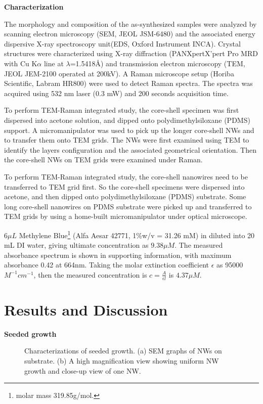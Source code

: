 \documentclass[11pt]{article} %
\begin{document}
\textbf{Characterization}

The morphology and composition of the as-synthesized samples were analyzed by scanning electron microscopy (SEM, JEOL JSM-6480) and the associated energy dispersive X-ray spectroscopy unit(EDS, Oxford Instrument INCA). Crystal structures were characterized using X-ray diffraction (PANXpertX’pert Pro MRD with Cu K$\alpha$ line at $\lambda$=1.5418\AA) and transmission electron microscopy (TEM, JEOL JEM-2100  operated at 200kV). A Raman microscope setup (Horiba Scientific, Labram HR800) were used to detect Raman spectra. The spectra was acquired using 532 nm laser (0.3 mW) and 200 seconds acquisition time.

To perform TEM-Raman integrated study, the core-shell specimen was first dispersed into acetone solution, and dipped onto polydimethylsiloxane (PDMS) support. A micromanipulator was used to pick up the longer core-shell NWs and to transfer them onto TEM grids. The NWs were first examined using TEM to identify the  layers configuration and the associated geometrical orientation. Then the core-shell NWs on TEM grids were examined under Raman.

To perform TEM-Raman integrated study, the core-shell nanowires need to be transferred to TEM grid first. So the core-shell specimens were dispersed into acetone, and then dipped onto polydimethylsiloxane (PDMS) substrate. Some long core-shell nanowires on PDMS substrate were picked up and transferred to TEM grids by using a home-built micromanipulator under optical microscope. 

$6\mu L$ Methylene Blue\footnote{ molar mass 319.85g/mol.} (Alfa Aesar 42771, 1\%w/v = 31.26 mM) in diluted into 20 mL DI water, giving ultimate concentration as $9.38 \mu M$. The measured absorbance spectrum is shown in supporting information, with maximum absorbance 0.42 at 664nm. Taking the  molar extinction coefficient $\epsilon$ as 95000 $M^{-1}cm^{-1}$,\cite{Cenens1988} then the measured concentration is $c = \frac{A}{\epsilon l}$ is $4.37 \mu M$.


\section{Results and Discussion}

\textbf{Seeded growth}

\begin{figure}[htb]
\centering
{}\hspace{0.04\textwidth}
\caption[Characterization of seeded growth : SEM]{Characterizations of seeded growth. (a) SEM graphs of  NWs on  substrate. (b) A high magnification view showing uniform NW growth and close-up view of one NW. }
\label{fig:woseedsem}
\end{figure}
\end{document}
